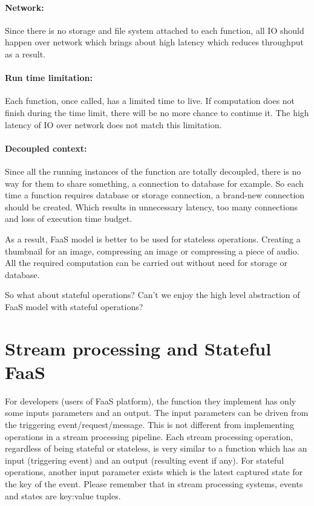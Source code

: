 \documentclass[a4]{report}
\begin{document}
    \paragraph{Network:} Since there is no storage and file system attached to each function, all IO should happen
    over network which brings about high latency which reduces throughput as a result.

    \paragraph{Run time limitation:} Each function, once called, has a limited time to live.
    If computation does not finish during the time limit, there will be no more chance to continue it.
    The high latency of IO over network does not match this limitation.

    \paragraph{Decoupled context:} Since all the running instances of the function are totally decoupled, there is
    no way for them to share something, a connection to database for example.
    So each time a function requires database or storage connection, a brand-new connection should be created.
    Which results in unnecessary latency, too many connections and loss of execution time budget.

    As a result, FaaS model is better to be used for stateless operations.
    Creating a thumbnail for an image, compressing an image or compressing a piece of audio.
    All the required computation can be carried out without need for storage or database.

    So what about stateful operations?
    Can't we enjoy the high level abstraction of FaaS model with stateful operations?


    \section{Stream processing and Stateful FaaS}
    For developers (users of FaaS platform), the function they implement has only some inputs parameters and an output.
    The input parameters can be driven from the triggering event/request/message.
    This is not different from implementing operations in a stream processing pipeline.
    Each stream processing operation, regardless of being stateful or stateless, is very similar to a function which
    has an input (triggering event) and an output (resulting event if any).
    For stateful operations, another input parameter exists which is the latest captured state for the key of the event.
    Please remember that in stream processing systems, events and states are key:value tuples.
\end{document}
